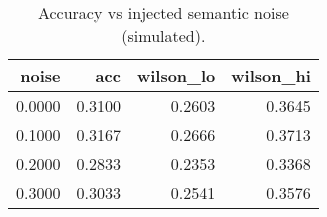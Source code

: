 \begin{table}[!ht]
\centering
\begin{table}
\caption{Accuracy vs injected semantic noise (simulated).}
\label{tab:fig10}
\begin{tabular}{rrrr}
\toprule
noise & acc & wilson\_lo & wilson\_hi \\
\midrule
0.0000 & 0.3100 & 0.2603 & 0.3645 \\
0.1000 & 0.3167 & 0.2666 & 0.3713 \\
0.2000 & 0.2833 & 0.2353 & 0.3368 \\
0.3000 & 0.3033 & 0.2541 & 0.3576 \\
\bottomrule
\end{tabular}
\end{table}
\end{table}
